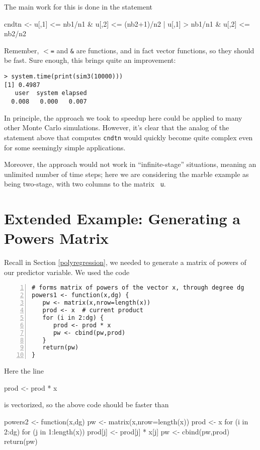 \noindent
The main work for this is done in the statement

\begin{Code}
cndtn <- u[,1] <= nb1/n1 & u[,2] <= (nb2+1)/n2 |
         u[,1] > nb1/n1 & u[,2] <= nb2/n2 
\end{Code}

\noindent
Remember, $<${\tt =} and {\tt \&} are functions, and in fact vector
functions, so they should be fast.  Sure enough, this brings quite an 
improvement: 

\begin{Verbatim}
> system.time(print(sim3(10000)))
[1] 0.4987
   user  system elapsed 
  0.008   0.000   0.007 
\end{Verbatim}

In principle, the approach we took to speedup here could be applied to
many other Monte Carlo simulations.  However, it's clear that the analog
of the statement above that computes {\tt cndtn} would quickly become
quite complex even for some seemingly simple applications.  

Moreover, the approach would not work in ``infinite-stage'' situations,
meaning an unlimited number of time steps; here we are considering the
marble example as being two-stage, with two columns to the matrix {\tt
u}.

\section{Extended Example:  Generating a Powers Matrix}

Recall in Section \ref{polyregression}, we needed to generate a matrix
of powers of our predictor variable.  We used the code

\begin{lstlisting}[numbers=left]
# forms matrix of powers of the vector x, through degree dg
powers1 <- function(x,dg) {
   pw <- matrix(x,nrow=length(x))
   prod <- x  # current product
   for (i in 2:dg) {
      prod <- prod * x
      pw <- cbind(pw,prod)
   }
   return(pw)
}
\end{lstlisting}

\noindent
Here the line

\begin{Code}
prod <- prod * x
\end{Code}

\noindent
is vectorized, so the above code should be faster than 

\begin{Code}
powers2 <- function(x,dg) {
   pw <- matrix(x,nrow=length(x))
   prod <- x
   for (i in 2:dg) {
      for (j in 1:length(x)) prod[j] <- prod[j] * x[j]
      pw <- cbind(pw,prod)
   }
   return(pw)
}
\end{Code}

